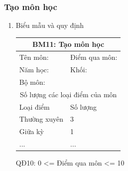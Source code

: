 \documentclass[a4paper]{article}
\begin{document}
						\subsubsection{Tạo môn học}	
						\begin{enumerate}
\item Biểu mẫu và quy định

\begin{table}[H]
\centering
\renewcommand{\arraystretch}{1.5}
\setlength{\tabcolsep}{15pt}
\begin{tabular}{|p{5cm}|p{5cm}|}
\hline
\multicolumn{2}{|c|}{\textbf{BM11: Tạo môn học}} \\  
\hline
Tên môn: \dotfill  & Điểm qua môn: \dotfill \\
\hline
Năm học: \dotfill & Khối: \dotfill \\
\hline
Bộ môn: \dotfill & \\
\hline
\multicolumn{2}{|c|}{Số lượng các loại điểm của môn} \\
\hline
Loại điểm & Số lượng \\
\hline
Thường xuyên & 3 \\
\hline
Giữa kỳ & 1 \\
\hline
... & ... \\
\hline
\end{tabular}
\end{table}

QĐ10: 0 <= Điểm qua môn <= 10


\end{enumerate}
\end{document}
